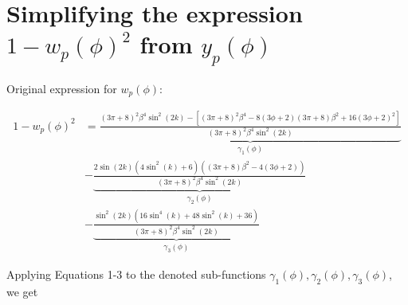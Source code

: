 \section{Simplifying the expression \texorpdfstring{$1-w_p(\phi)^2$ from $y_p(\phi)$}{}}

Original expression for $w_p(\phi)$:

\begin{align}
    1-w_p(\phi)^2&=\underbrace{\frac{(3\pi+8)^2\beta^4\sin^2(2k)-\left[(3\pi+8)^2\beta^4-8(3\phi+2)(3\pi+8)\beta^2+16(3\phi+2)^2\right]}{(3\pi+8)^2\beta^4\sin^2(2k)}}_{\gamma_1(\phi)}\\
    &-\underbrace{\frac{2\sin(2k)(4\sin^2(k)+6)((3\pi+8)\beta^2-4(3\phi+2))}{(3\pi+8)^2\beta^4\sin^2(2k)}}_{\gamma_2(\phi)}\\
    &-\underbrace{\frac{\sin^2(2k)(16\sin^4(k)+48\sin^2(k)+36)}{(3\pi+8)^2\beta^4\sin^2(2k)}}_{\gamma_3(\phi)}
\end{align}

Applying Equations 1-3 to the denoted sub-functions $\gamma_1(\phi),\gamma_2(\phi),\gamma_3(\phi)$, we get 
